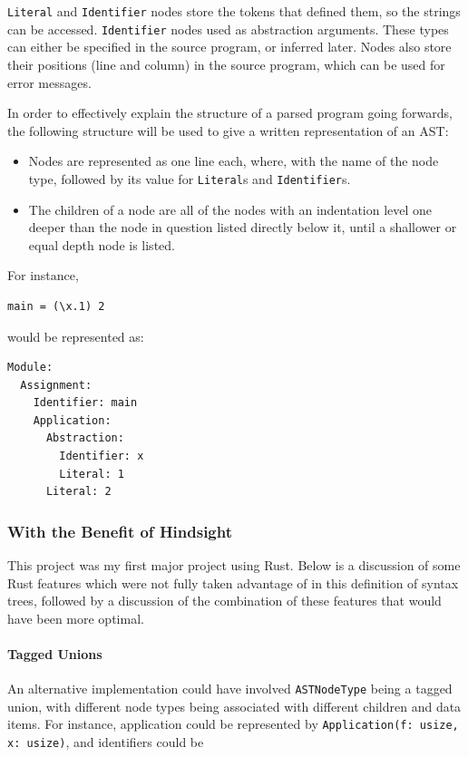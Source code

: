 \verb|Literal| and \verb|Identifier| nodes store the tokens that defined them, so the strings can be accessed. \verb|Identifier| nodes used as abstraction arguments. These types can either be specified in the source program, or inferred later. Nodes also store their positions (line and column) in the source program, which can be used for error messages. 

In order to effectively explain the structure of a parsed program going forwards, the following structure will be used to give a written representation of an AST:
\begin{itemize}
    \item Nodes are represented as one line each, where, with the name of the node type, followed by its value for \verb|Literal|s and \verb|Identifier|s.
    \item The children of a node are all of the nodes with an indentation level one deeper than the node in question listed directly below it, until a shallower or equal depth node is listed. 
\end{itemize}

\noindent
For instance, 
\begin{lstlisting}
main = (\x.1) 2
\end{lstlisting}
would be represented as:
\begin{lstlisting}
Module:
  Assignment:
    Identifier: main
    Application:
      Abstraction:
        Identifier: x
        Literal: 1
      Literal: 2
\end{lstlisting}

\subsubsection{With the Benefit of Hindsight} %
This project was my first major project using Rust. Below is a discussion of some Rust features which were not fully taken advantage of in this definition of syntax trees, followed by a discussion of the combination of these features that would have been more optimal. 

\paragraph{Tagged Unions}
An alternative implementation could have involved \verb|ASTNodeType| being a tagged union, with different node types being associated with different children and data items. For instance, application could be represented by \verb|Application(f: usize, x: usize)|, and identifiers could be 

